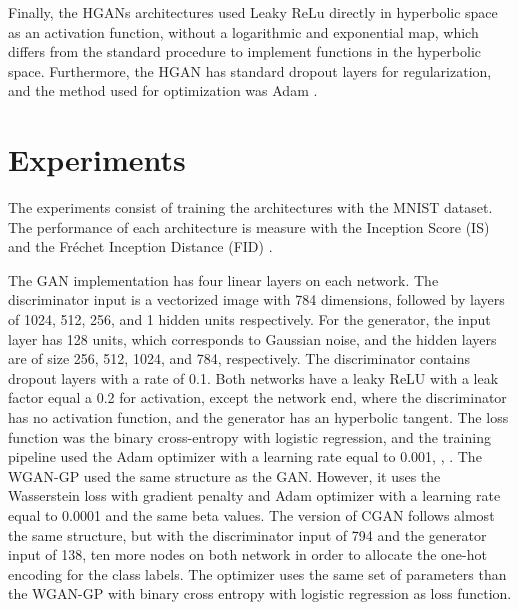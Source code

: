 \documentclass[journal]{IEEEtran}
\begin{document}
Finally, the HGANs architectures used Leaky ReLu directly in hyperbolic space as an activation function, without a logarithmic and exponential map, which differs from the standard procedure to implement functions in the hyperbolic space. Furthermore, the HGAN has standard dropout layers for regularization, and the method used for optimization was Adam \cite{adam}. 

 


\section{Experiments}





The experiments consist of training the architectures with the MNIST dataset. The performance of each architecture is measure with the Inception Score (IS) \cite{is_mnist} and the Fr\'echet Inception Distance (FID) \cite{fid}. \newline



The GAN implementation has four linear layers on each network. The discriminator input is a vectorized image with 784 dimensions, followed by layers of 1024, 512, 256, and 1 hidden units respectively. For the generator, the input layer has  128 units, which corresponds to Gaussian noise, and the hidden layers are of size 256, 512, 1024, and 784, respectively. The discriminator contains dropout layers with a rate of 0.1. Both networks have a leaky ReLU with a leak factor equal a 0.2 for activation, except the network end, where the discriminator has no activation function, and the generator has an hyperbolic tangent. The loss function was the binary cross-entropy with logistic regression, and the training pipeline used the Adam \cite{adam} optimizer with a learning rate equal to 0.001, , . The WGAN-GP used the same structure as the GAN. However, it uses the Wasserstein loss with gradient penalty \cite{wgan} and Adam optimizer with a learning rate equal to 0.0001 and the same beta values. The version of CGAN follows almost the same structure, but with the discriminator input of 794 and the generator input of 138, ten more nodes on both network in order to allocate the one-hot encoding for the class labels. The optimizer uses the same set of parameters than the WGAN-GP with binary cross entropy with logistic regression as loss function.\newline
\end{document}
